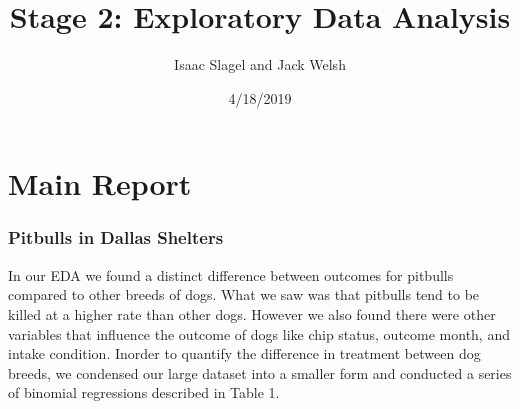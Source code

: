 \documentclass[]{article}
\title{Stage 2: Exploratory Data Analysis}
\author{Isaac Slagel and Jack Welsh}
\date{4/18/2019}
\begin{document}
\maketitle

\section{Main Report}\label{main-report}

\subsubsection{Pitbulls in Dallas
Shelters}\label{pitbulls-in-dallas-shelters}

In our EDA we found a distinct difference between outcomes for pitbulls
compared to other breeds of dogs. What we saw was that pitbulls tend to
be killed at a higher rate than other dogs. However we also found there
were other variables that influence the outcome of dogs like chip
status, outcome month, and intake condition. Inorder to quantify the
difference in treatment between dog breeds, we condensed our large
dataset into a smaller form and conducted a series of binomial
regressions described in Table 1.
\end{document}
